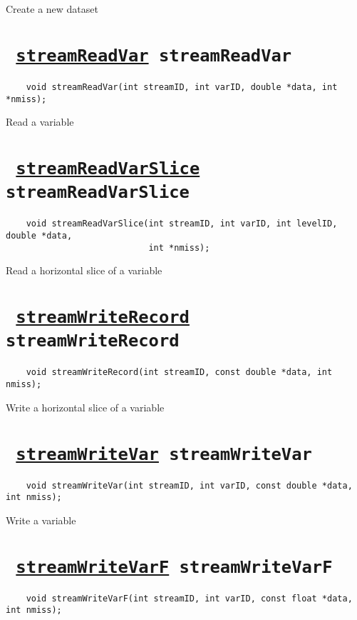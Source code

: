 Create a new dataset
\ifpdfoutput{}{(\ref{streamOpenWrite})}


\section*{\tt 
\ifpdf
\hyperref[streamReadVar]{streamReadVar}
\else
streamReadVar
\fi
}
\begin{verbatim}
    void streamReadVar(int streamID, int varID, double *data, int *nmiss);
\end{verbatim}

Read a variable
\ifpdfoutput{}{(\ref{streamReadVar})}


\section*{\tt 
\ifpdf
\hyperref[streamReadVarSlice]{streamReadVarSlice}
\else
streamReadVarSlice
\fi
}
\begin{verbatim}
    void streamReadVarSlice(int streamID, int varID, int levelID, double *data, 
                            int *nmiss);
\end{verbatim}

Read a horizontal slice of a variable
\ifpdfoutput{}{(\ref{streamReadVarSlice})}


\section*{\tt 
\ifpdf
\hyperref[streamWriteRecord]{streamWriteRecord}
\else
streamWriteRecord
\fi
}
\begin{verbatim}
    void streamWriteRecord(int streamID, const double *data, int nmiss);
\end{verbatim}

Write a horizontal slice of a variable
\ifpdfoutput{}{(\ref{streamWriteRecord})}


\section*{\tt 
\ifpdf
\hyperref[streamWriteVar]{streamWriteVar}
\else
streamWriteVar
\fi
}
\begin{verbatim}
    void streamWriteVar(int streamID, int varID, const double *data, int nmiss);
\end{verbatim}

Write a variable
\ifpdfoutput{}{(\ref{streamWriteVar})}


\section*{\tt 
\ifpdf
\hyperref[streamWriteVarF]{streamWriteVarF}
\else
streamWriteVarF
\fi
}
\begin{verbatim}
    void streamWriteVarF(int streamID, int varID, const float *data, int nmiss);
\end{verbatim}

